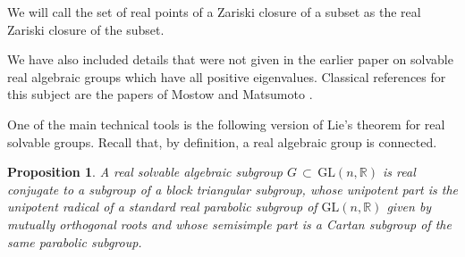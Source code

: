 \documentclass[12pt]{amsart}
\newtheorem{proposition}[theorem]{Proposition}
\begin{document}
We will call the set of real points of a Zariski closure of a subset as the
real Zariski closure of the subset.

We have also included details that were not given in the earlier paper \cite{AB}
on solvable real algebraic groups which have all positive eigenvalues.
Classical references for this subject are the papers of Mostow \cite{Mo} and
Matsumoto \cite{Ma}.

One of the main technical tools is the following version of Lie's theorem
for real solvable groups. Recall that, by definition, a real algebraic group
is connected.

\begin{proposition}
\label{thm1} A real solvable algebraic subgroup $G\, \subset\, \mathrm{GL}
(n, {\mathbb{R}})$ is real conjugate to a subgroup of a block triangular
subgroup, whose unipotent part is the unipotent radical of a standard real
parabolic subgroup of $\mathrm{GL}(n, {\mathbb{R}})$ given by mutually
orthogonal roots and whose semisimple part is a Cartan subgroup of the same
parabolic subgroup.
\end{proposition}
\end{document}
